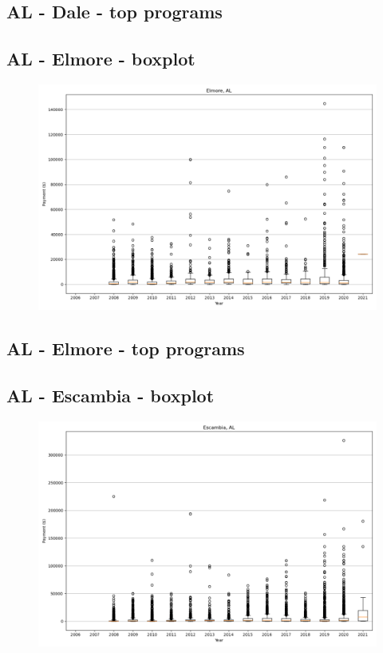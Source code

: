 \subsection*{AL - Dale - top programs}

\newpage
\subsection*{AL - Elmore - boxplot}
\begin{figure}[h]
\centering
\includegraphics[width=7in]{../output/boxplots/counties/Elmore-AL_boxplot.png}
\end{figure}


\subsection*{AL - Elmore - top programs}

\newpage
\subsection*{AL - Escambia - boxplot}
\begin{figure}[h]
\centering
\includegraphics[width=7in]{../output/boxplots/counties/Escambia-AL_boxplot.png}
\end{figure}


